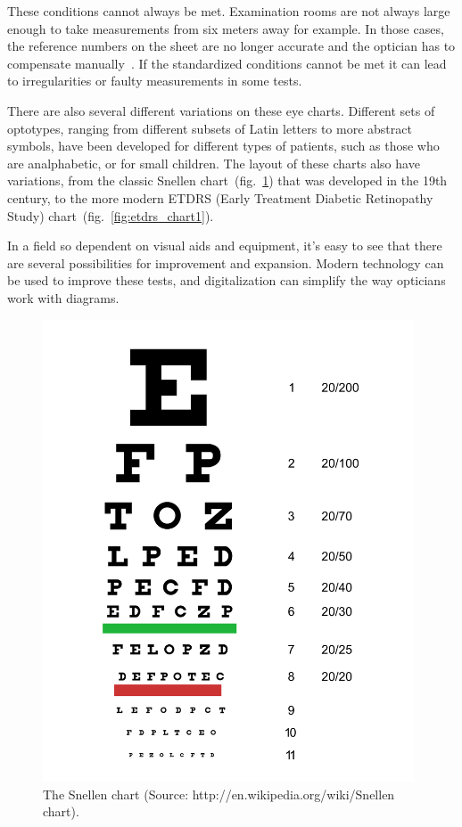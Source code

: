 \documentclass[12pt,a4paper,notitlepage]{report}
\begin{document}
These conditions cannot always be met. Examination rooms are not always large enough to take measurements from six meters away for example. In those cases, the reference numbers on the sheet are no longer accurate and the optician has to compensate manually~\cite{PGSoderbergOral}. If the standardized conditions cannot be met it can lead to irregularities or faulty measurements in some tests.

There are also several different variations on these eye charts. Different sets of optotypes, ranging from different subsets of Latin letters to more abstract symbols, have been developed for different types of patients, such as those who are analphabetic, or for small children. The layout of these charts also have variations, from the classic Snellen chart~(fig.~\ref{fig:snellen_chart1}) that was developed in the 19th century, to the more modern ETDRS (Early Treatment Diabetic Retinopathy Study) chart~(fig.~\ref{fig:etdrs_chart1}).


In a field so dependent on visual aids and equipment, it's easy to see that there are several possibilities for improvement and expansion. Modern technology can be used to improve these tests, and digitalization can simplify the way opticians work with diagrams.

\begin{figure}[ht!]
\centering
\includegraphics[width=110mm]{images/Snellen_chart.png}
\caption[The Snellen chart]{The Snellen chart (Source: http://en.wikipedia.org/wiki/Snellen chart\cite{img_snellen}).} \label{fig:snellen_chart1}
\end{figure} 
\end{document}
